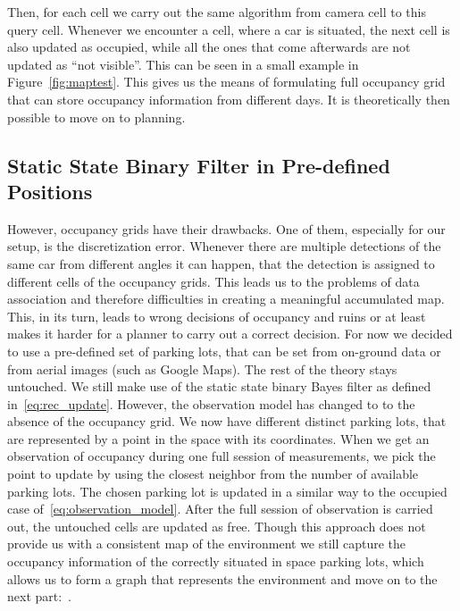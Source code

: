         Then, for each cell we carry out the same algorithm from camera cell
        to this query cell. Whenever we encounter a cell, where a car is
        situated, the next cell is also updated as occupied, while all the
        ones that come afterwards are not updated as ``not visible''. This can
        be seen in a small example in Figure~\ref{fig:maptest}. This gives us
        the means of formulating full occupancy grid that can store occupancy
        information from different days. It is theoretically then possible to
        move on to planning.

    \subsection{Static State Binary Filter in Pre-defined Positions}\label{sub:static_state_binary_filter_in_pre_defined_positions}

        However, occupancy grids have their drawbacks. One of them, especially
        for our setup, is the discretization error. Whenever there are
        multiple detections of the same car from different angles it can
        happen, that the detection is assigned to different cells of the
        occupancy grids. This leads us to the problems of data association and
        therefore difficulties in creating a meaningful accumulated map. This,
        in its turn, leads to wrong decisions of occupancy and ruins or at
        least makes it harder for a planner to carry out a correct decision.
        For now we decided to use a pre-defined set of parking lots, that can
        be set from on-ground data or from aerial images (such as Google
        Maps). The rest of the theory stays untouched. We still make use of
        the static state binary Bayes filter as defined
        in~\eqref{eq:rec_update}. However, the observation model has changed
        to to the absence of the occupancy grid. We now have different
        distinct parking lots, that are represented by a point in the space
        with its coordinates. When we get an observation of occupancy during
        one full session of measurements, we pick the point to update by using
        the closest neighbor from the number of available parking lots. The
        chosen parking lot is updated in a similar way to the occupied case
        of~\ref{eq:observation_model}. After the full session of observation
        is carried out, the untouched cells are updated as free. Though this
        approach does not provide us with a consistent map of the environment
        we still capture the occupancy information of the correctly situated
        in space parking lots, which allows us to form a graph that represents
        the environment and move on to the next
        part:~.

